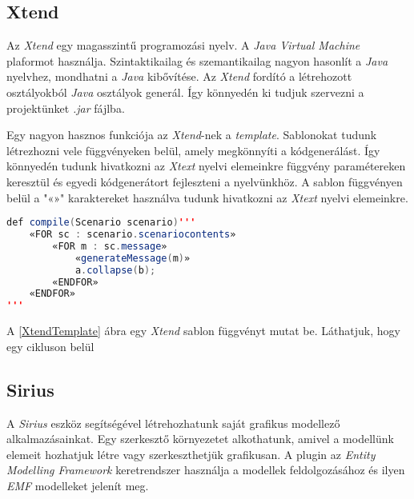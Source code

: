 \subsection{Xtend}

Az \textit{Xtend} egy magasszintű programozási nyelv.
A \textit{Java Virtual Machine} plaformot használja.
Szintaktikailag és szemantikailag nagyon hasonlít a \textit{Java} nyelvhez, mondhatni a \textit{Java} kibővítése.
Az \textit{Xtend} fordító a létrehozott osztályokból \textit{Java} osztályok generál.
Így könnyedén ki tudjuk szervezni a projektünket \textit{.jar} fájlba.

Egy nagyon hasznos funkciója az \textit{Xtend}-nek a \textit{template}.
Sablonokat tudunk létrezhozni vele függvényeken belül, amely megkönnyíti a kódgenerálást.
Így könnyedén tudunk hivatkozni az \textit{Xtext} nyelvi elemeinkre függvény paramétereken keresztül és egyedi kódgenerátort fejleszteni a nyelvünkhöz.
A sablon függvényen belül a "«»" karaktereket használva tudunk hivatkozni az \textit{Xtext} nyelvi elemeinkre.

\begin{lstlisting}[language=java, frame=single, float=ht!, caption={Xtend template.},captionpos=b, label=XtendTemplate]
def compile(Scenario scenario)'''
	«FOR sc : scenario.scenariocontents»
		«FOR m : sc.message»
			«generateMessage(m)»
			a.collapse(b);
		«ENDFOR»
	«ENDFOR»
'''
\end{lstlisting}

A \ref{XtendTemplate} ábra egy \textit{Xtend} sablon függvényt mutat be.
Láthatjuk, hogy egy cikluson belül

\subsection{Sirius}

A \textit{Sirius} eszköz segítségével létrehozhatunk saját grafikus modellező alkalmazásainkat.
Egy szerkesztő környezetet alkothatunk, amivel a modellünk elemeit hozhatjuk létre vagy szerkeszthetjük grafikusan.
A plugin az \textit{Entity Modelling Framework} keretrendszer használja a modellek feldolgozásához és ilyen \textit{EMF} modelleket jelenít meg.